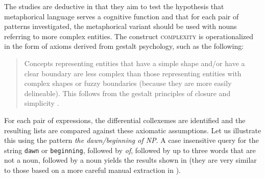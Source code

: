 The studies are deductive  in that they aim to test the hypothesis that metaphorical  language serves a cognitive  function and that for each pair of patterns investigated, the metaphorical variant should be used with nouns  referring to more complex entities. The construct \textsc{complexity} is operationalized  in the form of axioms derived from gestalt psychology,  such as the following:

\begin{quote}
Concepts representing entities that have a simple shape and\slash or have a clear boundary are less complex than those representing entities with complex shapes or fuzzy boundaries (because they are more easily delineable). This follows from the gestalt principles of closure and simplicity \citep[170]{stefanowitsch_function_2005}.
\end{quote}

For each pair of expressions, the differential collexemes  are identified and the resulting lists are compared against these axiomatic assumptions. Let us illustrate this using the pattern \textit{the dawn\slash beginning of NP}. A case insensitive query for the string \texttt{dawn} or \texttt{beginning}, followed by \textit{of}, followed by up to three words that are not a noun,  followed by a noun yields the results shown in  (they are very similar to those based on a more careful manual extraction  in \citealt{stefanowitsch_function_2005}).

